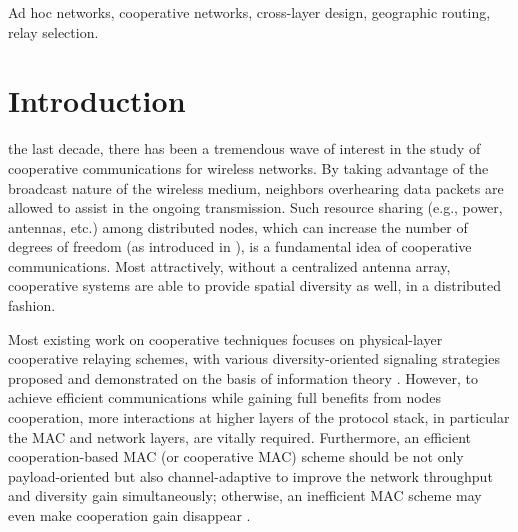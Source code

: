 \documentclass[journal,twoside,final]{IEEEtran}
\begin{document}
\begin{IEEEkeywords}
Ad hoc networks, cooperative networks, cross-layer design, geographic routing, relay selection.
\end{IEEEkeywords}



\section{Introduction}
 the last decade, there has been a tremendous wave of interest in the study of cooperative communications for wireless networks. By taking advantage of the broadcast nature of the wireless medium, neighbors overhearing data packets are allowed to assist in the ongoing transmission. Such resource sharing (e.g., power, antennas, etc.) among distributed nodes, which can increase the number of degrees of freedom (as introduced in \cite{Zheng2003}), is a fundamental idea of cooperative communications. Most attractively, without a centralized antenna array, cooperative systems are able to provide spatial diversity as well, in a distributed fashion.


Most existing work on cooperative techniques focuses on physical-layer cooperative relaying schemes, with various diversity-oriented signaling strategies proposed and demonstrated on the basis of information theory \cite{Nosratinia2004,Laneman2004,Laneman2003,Sendonaris2003,Kramer2005,SSL2007}. However, to achieve efficient communications while gaining full benefits from nodes cooperation, more interactions at higher layers of the protocol stack, in particular the MAC and network layers, are vitally required. Furthermore, an efficient cooperation-based MAC (or cooperative MAC) scheme should be not only payload-oriented but also channel-adaptive to improve the network throughput and diversity gain simultaneously; otherwise, an inefficient MAC scheme may even make cooperation gain disappear \cite{shan2009}.
\end{document}

